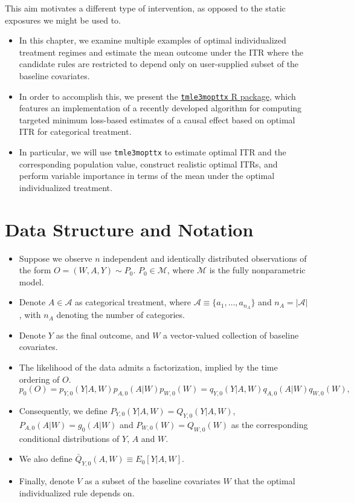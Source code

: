 \documentclass[
  12pt, krantz2,
]{book}
\newcommand{\passthrough}[1]{#1}
\theoremstyle{definition}
\theoremstyle{definition}
\theoremstyle{definition}
\newcommand{\1}{\mathbbm{1}}
\begin{document}
This aim motivates a different type of intervention, as opposed to the static exposures we
might be used to.

\begin{itemize}
\item
  In this chapter, we examine multiple examples of optimal individualized
  treatment regimes
  and estimate the mean outcome under the ITR
  where the candidate rules are restricted to depend only on user-supplied subset of the
  baseline covariates.
\item
  In order to accomplish this, we present the \href{https://github.com/tlverse/tmle3mopttx}{\passthrough{\lstinline!tmle3mopttx!} R
  package}, which features an
  implementation of a recently developed algorithm for computing targeted minimum
  loss-based estimates of a causal effect based on optimal ITR for
  categorical treatment.
\item
  In particular, we will use \passthrough{\lstinline!tmle3mopttx!} to estimate
  optimal ITR and the corresponding population value,
  construct realistic optimal ITRs, and perform variable importance in terms of the
  mean under the optimal individualized treatment.
\end{itemize}

\hypertarget{data-structure-and-notation}{%
\section{Data Structure and Notation}\label{data-structure-and-notation}}

\begin{itemize}
\item
  Suppose we observe \(n\) independent and identically distributed observations of
  the form \(O=(W,A,Y) \sim P_0\). \(P_0 \in \mathcal{M}\), where \(\mathcal{M}\) is the
  fully nonparametric model.
\item
  Denote \(A \in \mathcal{A}\) as categorical treatment, where
  \(\mathcal{A} \equiv \{a_1, \ldots, a_{n_A} \}\) and \(n_A = |\mathcal{A}|\), with
  \(n_A\) denoting the number of categories.
\item
  Denote \(Y\) as the final outcome, and \(W\) a vector-valued collection of baseline
  covariates.
\item
  The likelihood of the data admits a factorization, implied by the time ordering of \(O\).
  \begin{equation*}\label{eqn:likelihood_factorization}
  p_0(O) = p_{Y,0}(Y|A,W) p_{A,0}(A|W) p_{W,0}(W) = q_{Y,0}(Y|A,W) q_{A,0}(A|W) q_{W,0}(W),
  \end{equation*}
\item
  Consequently, we define
  \(P_{Y,0}(Y|A,W)=Q_{Y,0}(Y|A,W)\), \(P_{A,0}(A|W)=g_0(A|W)\) and \(P_{W,0}(W)=Q_{W,0}(W)\) as the
  corresponding conditional distributions of \(Y\), \(A\) and \(W\).
\item
  We also define \(\bar{Q}_{Y,0}(A,W) \equiv E_0[Y|A,W]\).
\item
  Finally, denote \(V\) as a subset of the baseline covariates \(W\) that
  the optimal individualized rule depends on.
\end{itemize}
\end{document}
